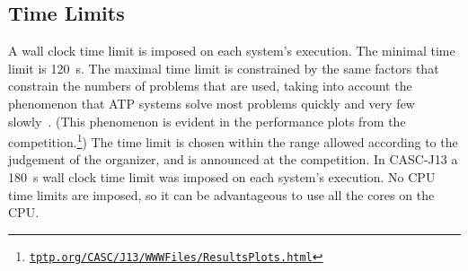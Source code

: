 \documentclass[aic]{iosart2x}
\newcommand{\THIS}{\mbox{CASC-J13}}
\begin{document}
\subsection{Time Limits}
\label{TimeLimits}

A wall clock time limit is imposed on each system's execution.
The minimal time limit is 120~s.
The maximal time limit is constrained by the same factors that constrain the numbers of problems 
that are used, taking into account the phenomenon that ATP systems solve most problems quickly 
and very few slowly~\cite{SS01,Sut24}.
(This phenomenon is evident in the performance plots from the competition.\footnote{%
\href{https://tptp.org/CASC/J13/WWWFiles/ResultsPlots.html}{\tt tptp.org/CASC/J13/WWWFiles/ResultsPlots.html}})
The time limit is chosen within the range allowed according to the judgement of the
organizer, and is announced at the competition.
In \THIS{} a 180~s wall clock time limit was imposed on each system's execution.
No CPU time limits are imposed, so it can be advantageous to use all the cores on the CPU.


% 
\end{document}
